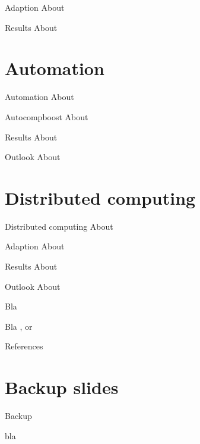 \documentclass[10pt]{beamer}
\begin{document}
\begin{frame}{Adaption}
  About
\end{frame}

\begin{frame}{Results}
  About
\end{frame}


\section{Automation}

\begin{frame}{Automation}
  About
\end{frame}

\begin{frame}{Autocompboost}
  About
\end{frame}

\begin{frame}{Results}
  About
\end{frame}

\begin{frame}{Outlook}
  About
\end{frame}


\section{Distributed computing}

\begin{frame}{Distributed computing}
  About
\end{frame}

\begin{frame}{Adaption}
  About
\end{frame}

\begin{frame}{Results}
  About
\end{frame}

\begin{frame}{Outlook}
  About
\end{frame}


\begin{frame}[allowframebreaks]{Bla}

  Bla
  \citep[see, e.g.,][]{Pepe2003}, or \cite{delong1988comparing}

\end{frame}

\appendix

\begin{frame}[allowframebreaks]{References}

\nocite{*}
\scriptsize


\end{frame}

\section{Backup slides}

\begin{frame}{Backup}

bla

\end{frame}
\end{document}
